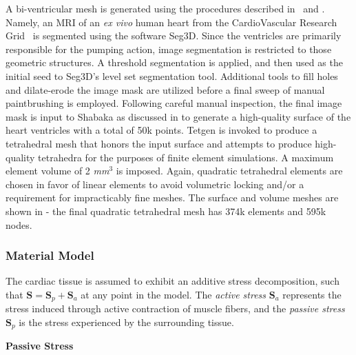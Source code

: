 A bi-ventricular mesh is generated using the procedures described in~ and . Namely, an MRI of an \textit{ex vivo} human heart from the CardioVascular Research Grid~\cite{cvgg} is segmented using the software Seg3D. Since the ventricles are primarily responsible for the pumping action, image segmentation is restricted to those geometric structures. A threshold segmentation is applied, and then used as the initial seed to Seg3D's level set segmentation tool. Additional tools to fill holes and dilate-erode the image mask are utilized before a final sweep of manual paintbrushing is employed. Following careful manual inspection, the final image mask is input to Shabaka as discussed in  to generate a high-quality surface of the heart ventricles with a total of 50k points. Tetgen is invoked to produce a tetrahedral mesh that honors the input surface and attempts to produce high-quality tetrahedra for the purposes of finite element simulations. A maximum element volume of 2 \textit{mm$^3$} is imposed. Again, quadratic tetrahedral elements are chosen in favor of linear elements to avoid volumetric locking and/or a requirement for impracticably fine meshes. The surface and volume meshes are shown in  - the final quadratic tetrahedral mesh has 374k elements and 595k nodes.

\subsubsection{Material Model}
\label{Material Model}

The cardiac tissue is assumed to exhibit an additive stress decomposition, such that $\bm{S} = \bm{S}_p + \bm{S}_a$ at any point in the model. The \textit{active stress} $\bm{S}_a$ represents the stress induced through active contraction of muscle fibers, and the \textit{passive stress} $\bm{S}_p$ is the stress experienced by the surrounding tissue.

\textbf{Passive Stress}

